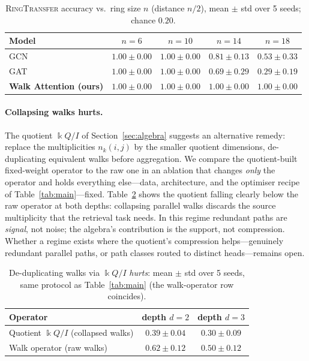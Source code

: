 \documentclass[runningheads]{llncs}
\newcommand{\kk}{\Bbbk}
\newcommand{\kQ}{\kk Q}
\begin{document}
\begin{table}[t]
\centering
\caption{\textsc{RingTransfer} accuracy vs.\ ring size $n$ (distance $n/2$),
mean $\pm$ std over 5 seeds; chance $0.20$.}
\label{tab:ring}
\begin{tabular}{lcccc}
\toprule
\textbf{Model} & $n{=}6$ & $n{=}10$ & $n{=}14$ & $n{=}18$ \\
\midrule
GCN                    & $1.00\pm0.00$ & $1.00\pm0.00$ & $0.81\pm0.13$ & $0.53\pm0.33$ \\
GAT                    & $1.00\pm0.00$ & $1.00\pm0.00$ & $0.69\pm0.29$ & $0.29\pm0.19$ \\
\textbf{Walk Attention (ours)} & $\mathbf{1.00\pm0.00}$ & $\mathbf{1.00\pm0.00}$ & $\mathbf{1.00\pm0.00}$ & $\mathbf{1.00\pm0.00}$ \\
\bottomrule
\end{tabular}
\end{table}

\paragraph{Collapsing walks hurts.}
The quotient $\kQ/I$ of Section~\ref{sec:algebra} suggests an alternative
remedy: replace the multiplicities $n_k(i,j)$ by the smaller quotient
dimensions, de-duplicating equivalent walks before aggregation. We compare the
quotient-built fixed-weight operator to the raw one in an ablation that changes
\emph{only} the operator and holds everything else---data, architecture, and
the optimiser recipe of Table~\ref{tab:main}---fixed. Table~\ref{tab:quotient}
shows the quotient falling clearly below the raw operator at both depths:
collapsing parallel walks discards the source multiplicity that the retrieval
task needs. In this regime redundant paths are \emph{signal}, not noise; the
algebra's contribution is the support, not compression. Whether a regime exists
where the quotient's compression helps---genuinely redundant parallel paths, or
path classes routed to distinct heads---remains open.

\begin{table}[t]
\centering
\caption{De-duplicating walks via $\kQ/I$ \emph{hurts}: mean $\pm$ std over 5
seeds, same protocol as Table~\ref{tab:main} (the walk-operator row coincides).}
\label{tab:quotient}
\begin{tabular}{lcc}
\toprule
\textbf{Operator} & \textbf{depth $d=2$} & \textbf{depth $d=3$} \\
\midrule
Quotient $\kQ/I$ (collapsed walks) & $0.39\pm0.04$ & $0.30\pm0.09$ \\
Walk operator (raw walks)          & $\mathbf{0.62\pm0.12}$ & $\mathbf{0.50\pm0.12}$ \\
\bottomrule
\end{tabular}
\end{table}
\end{document}
